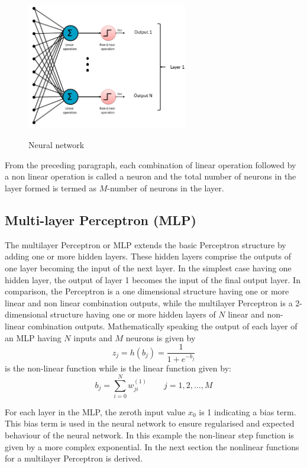 \begin{figure}
\centering
  \includegraphics[width=7cm]{thesis/images/ptron3.png}\\
  \caption{Neural network} \label{fig_3_2_nn}
\end{figure}

From the preceding paragraph, each combination of linear operation followed by a non linear operation is called a neuron and the total number of neurons in the layer formed is termed as $M$-number of neurons in the layer.

\subsection{Multi-layer Perceptron (MLP)}
The multilayer Perceptron or MLP extends the basic Perceptron structure by adding one or more hidden layers.  These hidden layers comprise the outputs of one layer becoming the input of the next layer. In the simplest case having one hidden layer, the output of layer 1 becomes the input of the final output layer.  In comparison, the Perceptron is a one dimensional structure having one or more linear and non linear combination outputs, while the multilayer Perceptron is a 2-dimensional structure having one or more hidden layers of $N$ linear and non-linear combination outputs.  Mathematically speaking the output of each layer of an MLP having $N$ inputs and $M$ neurons is given by
\begin{equation}
z_j=h(b_j)=\frac{1}{ 1+e^{-b_j}} 
\label{eqn_c3_nn_01}
\end{equation}
 is the non-linear function while  is the linear function given by:
\begin{equation}
b_j=\sum_{i=0}^Nw_{ji}^{(1)}\qquad j=1,2,\dots,M
\label{eqn_c3_nn_02}
\end{equation}

For each layer in the MLP, the zeroth input value $x_0$ is 1 indicating a bias term.  This bias term is used in the neural network to ensure regularised and expected behaviour of the neural network.  In this example the non-linear step function is given by a more complex exponential.  In the next section the nonlinear functions for a multilayer Perceptron is derived.
